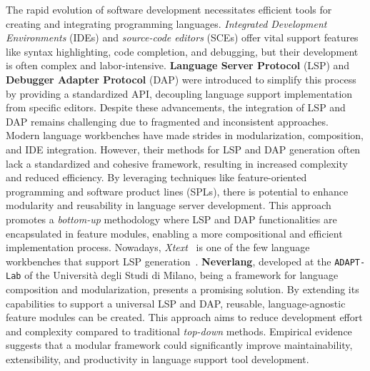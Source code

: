 The rapid evolution of software development necessitates efficient tools for creating and integrating programming languages. \textit{Integrated Development Environments} (IDEs) and \textit{source-code editors} (SCEs) offer vital support features like syntax highlighting, code completion, and debugging, but their development is often complex and labor-intensive. \textbf{Language Server Protocol} (LSP) and \textbf{Debugger Adapter Protocol} (DAP) were introduced to simplify this process by providing a standardized API, decoupling language support implementation from specific editors. Despite these advancements, the integration of LSP and DAP remains challenging due to fragmented and inconsistent approaches. Modern language workbenches have made strides in modularization, composition, and IDE integration. However, their methods for LSP and DAP generation often lack a standardized and cohesive framework, resulting in increased complexity and reduced efficiency. By leveraging techniques like feature-oriented programming and software product lines (SPLs), there is potential to enhance modularity and reusability in language server development. This approach promotes a \textit{bottom-up} methodology where LSP and DAP functionalities are encapsulated in feature modules, enabling a more compositional and efficient implementation process. Nowadays, \textit{Xtext}~\cite{Bettini13b} is one of the few language workbenches that support LSP generation~\cite{Barros22}. \textbf{Neverlang}, developed at the \texttt{ADAPT-Lab} of the Università degli Studi di Milano, being a framework for language composition and modularization, presents a promising solution. By extending its capabilities to support a universal LSP and DAP, reusable, language-agnostic feature modules can be created. This approach aims to reduce development effort and complexity compared to traditional \textit{top-down} methods. Empirical evidence suggests that a modular framework could significantly improve maintainability, extensibility, and productivity in language support tool development.

